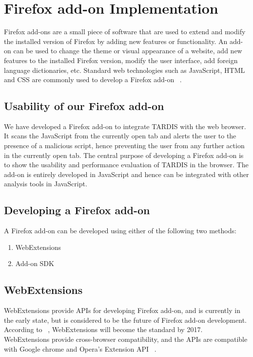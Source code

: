 \chapter{Firefox add-on Implementation \label{add-on}}

Firefox add-ons are a small piece of software that are used to extend and modify the installed version of Firefox by adding new features or functionality. An add-on can be used to change the theme or visual appearance of a website, add new features to the installed Firefox version, modify the user interface, add foreign language dictionaries, etc. Standard web technologies such as JavaScript, HTML and CSS are commonly used to develop a Firefox add-on ~\cite{g18}.

\section{Usability of our Firefox add-on}

We have developed a Firefox add-on to integrate TARDIS with the web browser. It scans the JavaScript from the currently open tab and alerts the user to the presence of a malicious script, hence preventing the user from any further action in the currently open tab. The central purpose of developing a Firefox add-on is to show the usability and performance evaluation of TARDIS in the browser. The add-on is entirely developed in JavaScript and hence can be integrated with other analysis tools in JavaScript.

\section{Developing a Firefox add-on}

A Firefox add-on can be developed using either of the following two methods:
\begin{enumerate}
\item WebExtensions
\item Add-on SDK
\end{enumerate}

\section{WebExtensions }

WebExtensions provide APIs for developing Firefox add-on, and is currently in the early state, but is considered to be the future of Firefox add-on development. According to ~\cite{g18}, WebExtensions will become the standard by 2017.  WebExtensions provide cross-browser compatibility, and the APIs are compatible with Google chrome and Opera's Extension API ~\cite{g18}. 

